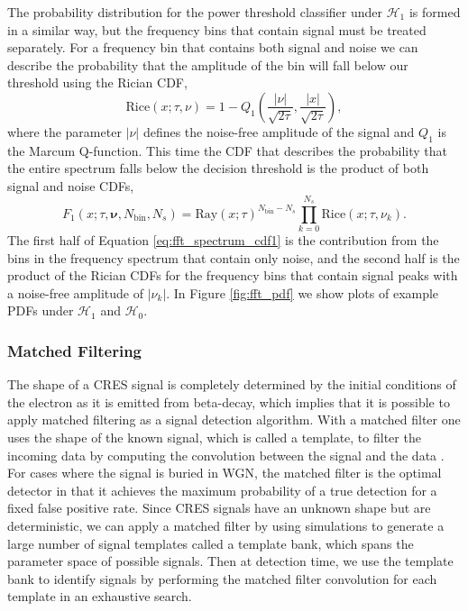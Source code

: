 The probability distribution for the power threshold classifier under $\mathcal{H}_1$ is formed in a similar way, but the frequency bins that contain signal must be treated separately. For a frequency bin that contains both signal and noise we can describe the probability that the amplitude of the bin will fall below our threshold using the Rician CDF,
\begin{equation}
    \mathrm{Rice}(x;\tau, \nu)=1-Q_1\left(\frac{|\nu|}{\sqrt{2\tau}},\frac{|x|}{\sqrt{2\tau}}\right),
\end{equation}
where the parameter $|\nu|$ defines the noise-free amplitude of the signal and $Q_1$ is the Marcum Q-function. This time the CDF that describes the probability that the entire spectrum falls below the decision threshold is the product of both signal and noise CDFs,
\begin{equation}
    F_1(x;\tau, \mathbf{\nu}, N_\mathrm{bin}, N_s)=\mathrm{Ray}(x;\tau)^{N_\mathrm{bin}-N_s}\prod_{k=0}^{N_s}{\mathrm{Rice}(x;\tau, \nu_k)}.
    \label{eq:fft_spectrum_cdf1}
\end{equation}
The first half of Equation \ref{eq:fft_spectrum_cdf1} is the contribution from the bins in the frequency spectrum that contain only noise, and the second half is the product of the Rician CDFs for the frequency bins that contain signal peaks with a noise-free amplitude of $|\nu_k|$. In Figure \ref{fig:fft_pdf} we show plots of example PDFs under $\mathcal{H}_1$ and $\mathcal{H}_0$.

\subsubsection{Matched Filtering}

The shape of a CRES signal is completely determined by the initial conditions of the electron as it is emitted from beta-decay, which implies that it is possible to apply matched filtering as a signal detection algorithm. With a matched filter one uses the shape of the known signal, which is called a template, to filter the incoming data by computing the convolution between the signal and the data \cite{detection_theory}. For cases where the signal is buried in WGN, the matched filter is the optimal detector in that it achieves the maximum probability of a true detection for a fixed false positive rate. Since CRES signals have an unknown shape but are deterministic, we can apply a matched filter by using simulations to generate a large number of signal templates called a template bank, which spans the parameter space of possible signals. Then at detection time, we use the template bank to identify signals by performing the matched filter convolution for each template in an exhaustive search.

